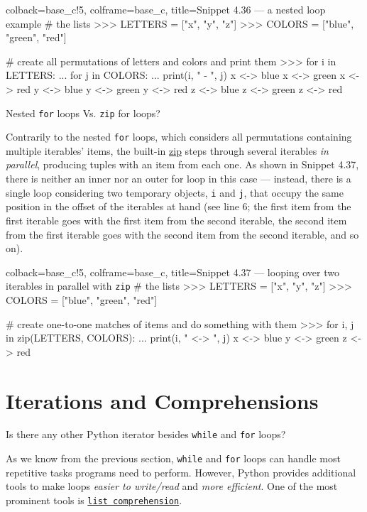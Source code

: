 \documentclass[a4paper,11pt]{book}
\newcommand{\question}[1]{%
    \begin{tcolorbox}[colback=comp_c!10,colframe=comp_c,sidebyside align=top,width=\linewidth,before skip=1ex]
        #1
    \end{tcolorbox}
    \switchcolumn%
}
\newcommand{\note}[1]{%
    \begin{tcolorbox}[colback=white!0,colframe=white!10,width=\linewidth,before skip=1ex]
        #1
    \end{tcolorbox}
}
\begin{document}
\begin{pythoncode}[linenos=true,]{colback=base_c!5, colframe=base_c, title=\sffamily Snippet 4.36 --- a nested loop example}
# the lists
>>> LETTERS = ["x", "y", "z"]
>>> COLORS = ["blue", "green", "red"]

# create all permutations of letters and colors and print them
>>> for i in LETTERS:
...     for j in COLORS:
...         print(i, " - ", j)
x  <->  blue
x  <->  green
x  <->  red
y  <->  blue
y  <->  green
y  <->  red
z  <->  blue
z  <->  green
z  <->  red
\end{pythoncode}
\clearpage

\begin{paracol}{2}
	\question{\raggedright Nested \texttt{for} loops Vs. \texttt{zip} for loops?}
	\note{Contrarily to the nested \texttt{for} loops, which considers all permutations containing multiple iterables' items, the built-in \href{https://docs.python.org/3/library/functions.html\#zip}{zip} steps through several iterables \emph{in parallel}, producing tuples with an item from each one. As shown in Snippet 4.37, there is neither an inner nor an outer for loop in this case --- instead, there is a single loop considering two temporary objects, \texttt{i} and \texttt{j}, that occupy the same position in the offset of the iterables at hand (see line 6; the first item from the first iterable goes with the first item from the second iterable, the second item from the first iterable goes with the second item from the second iterable, and so on).}
\end{paracol}

\begin{pythoncode}[linenos=true,]{colback=base_c!5, colframe=base_c, title=\sffamily Snippet 4.37 --- looping over two iterables in parallel with \texttt{zip} }
# the lists
>>> LETTERS = ["x", "y", "z"]
>>> COLORS = ["blue", "green", "red"]

# create one-to-one matches of items and do something with them
>>> for i, j in zip(LETTERS, COLORS):
...     print(i, " <-> ", j)
x  <->  blue
y  <->  green
z  <->  red
\end{pythoncode}

\section{Iterations and Comprehensions}
\label{sec:iterations_and_comprhensions}

\begin{paracol}{2}
	\question{\raggedright Is there any other Python iterator besides \texttt{while} and \texttt{for} loops?}
	\note{As we know from the previous section, \texttt{while} and \texttt{for} loops can handle most repetitive tasks programs need to perform. However, Python provides additional tools to make loops \emph{easier to write/read} and \emph{more efficient}. One of the most prominent tools is \href{https://docs.python.org/3/tutorial/datastructures.html}{\texttt{list comprehension}}.}
\end{paracol}
\end{document}
